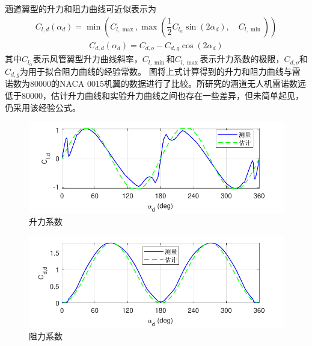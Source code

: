 涵道翼型的升力和阻力曲线可近似表示为\cite{Johnson_2005}
\begin{align}
C_{l, d}(\alpha_d)=\min \left(C_{l, \max }, \max \left(\dfrac{1}{2} C_{l_{\alpha}} \sin (2 \alpha_d), \quad C_{l, \min }\right)\right)
\end{align}
\begin{align}
C_{d, d}(\alpha_d)=C_{d, o }-C_{d, g } \cos (2 \alpha_d)
\end{align}
其中$ C_{l_{\alpha}} $表示风管翼型升力曲线斜率，$ C_{l, \min } $和$ C_{l, \max } $表示升力系数的极限，$ C_{d, o } $和$ C_{d, g } $为用于拟合阻力曲线的经验常数。 图将上式计算得到的升力和阻力曲线与雷诺数为80000的NACA 0015机翼的数据\cite{Sheldahl_1981}进行了比较。所研究的涵道无人机雷诺数远低于80000，估计升力曲线和实验升力曲线之间也存在一些差异，但未简单起见，仍采用该经验公式。
\begin{figure}[htbp]
	\centering
	\includegraphics[scale=1]{Fig/Fig_C_L.pdf}
	\caption{\label{Fig_C_L}升力系数}
\end{figure}
\begin{figure}[htbp]
	\centering
	\includegraphics[scale=1]{Fig/Fig_C_D.pdf}
	\caption{\label{Fig_C_D}阻力系数}
\end{figure}

